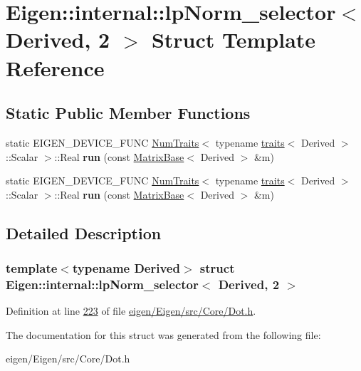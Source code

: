 \hypertarget{struct_eigen_1_1internal_1_1lp_norm__selector_3_01_derived_00_012_01_4}{}\section{Eigen\+:\+:internal\+:\+:lp\+Norm\+\_\+selector$<$ Derived, 2 $>$ Struct Template Reference}
\label{struct_eigen_1_1internal_1_1lp_norm__selector_3_01_derived_00_012_01_4}
\subsection*{Static Public Member Functions}
\begin{DoxyCompactItemize}
\item 
\mbox{\label{struct_eigen_1_1internal_1_1lp_norm__selector_3_01_derived_00_012_01_4_a35407fefaed1229fa4860301b0e1a130}} 
static E\+I\+G\+E\+N\+\_\+\+D\+E\+V\+I\+C\+E\+\_\+\+F\+U\+NC \hyperlink{group___core___module_struct_eigen_1_1_num_traits}{Num\+Traits}$<$ typename \hyperlink{struct_eigen_1_1internal_1_1traits}{traits}$<$ Derived $>$\+::Scalar $>$\+::Real {\bfseries run} (const \hyperlink{group___core___module_class_eigen_1_1_matrix_base}{Matrix\+Base}$<$ Derived $>$ \&m)
\item 
\mbox{\label{struct_eigen_1_1internal_1_1lp_norm__selector_3_01_derived_00_012_01_4_a35407fefaed1229fa4860301b0e1a130}} 
static E\+I\+G\+E\+N\+\_\+\+D\+E\+V\+I\+C\+E\+\_\+\+F\+U\+NC \hyperlink{group___core___module_struct_eigen_1_1_num_traits}{Num\+Traits}$<$ typename \hyperlink{struct_eigen_1_1internal_1_1traits}{traits}$<$ Derived $>$\+::Scalar $>$\+::Real {\bfseries run} (const \hyperlink{group___core___module_class_eigen_1_1_matrix_base}{Matrix\+Base}$<$ Derived $>$ \&m)
\end{DoxyCompactItemize}


\subsection{Detailed Description}
\subsubsection*{template$<$typename Derived$>$\newline
struct Eigen\+::internal\+::lp\+Norm\+\_\+selector$<$ Derived, 2 $>$}



Definition at line \hyperlink{eigen_2_eigen_2src_2_core_2_dot_8h_source_l00223}{223} of file \hyperlink{eigen_2_eigen_2src_2_core_2_dot_8h_source}{eigen/\+Eigen/src/\+Core/\+Dot.\+h}.



The documentation for this struct was generated from the following file\+:\begin{DoxyCompactItemize}
\item 
eigen/\+Eigen/src/\+Core/\+Dot.\+h\end{DoxyCompactItemize}
